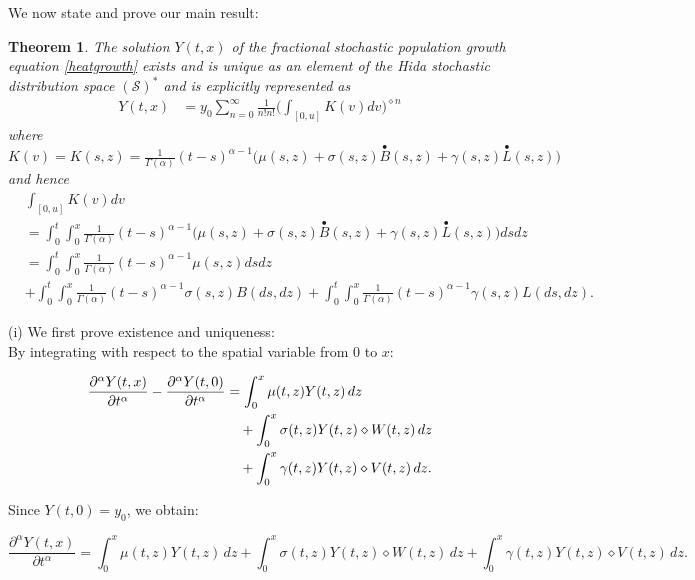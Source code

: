 \documentclass[12pt]{article}%
\newtheorem{theorem}{Theorem}[section]
\newcommand{\dproof}{\noindent {Proof.} \quad}
\numberwithin{equation}{section}
\def\S{\mathcal{S}}
\def\d{\diamond}
\def\d{\diamond}
\begin{document}
We now state and prove our main result:
\begin{theorem}
    The solution $Y(t,x)$ of the fractional stochastic population growth equation \ref{heatgrowth} exists and is unique as an element of the Hida stochastic distribution space $(\S)^{*}$ and is explicitly represented as
\begin{align}
    Y(t,x)&=y_0 \sum_{n=0}^\infty \frac{1}{n!n!} \Big(\int_{[0,u]} K(v) dv \Big)^{\d n}
\end{align}
where \\
$K(v)=K(s,z)=\frac{1}{\Gamma(\alpha)}(t-s)^{\alpha -1}\Big(\mu(s,z) +\sigma(s,z)\overset{\bullet}{B}(s,z)  + \gamma(s,z) \overset{\bullet}{L}(s,z)\Big)$\\
and hence
\begin{align}
 &\int_{[0,u]} K(v) dv\nonumber\\
 &=\int_0^t \int_0^x \frac{1}{\Gamma(\alpha)}(t-s)^{\alpha -1}\Big(\mu(s,z) +\sigma(s,z)\overset{\bullet}{B}(s,z)  + \gamma(s,z) \overset{\bullet}{L}(s,z)\Big)ds dz\nonumber \\
 &= \int_0^t\int_0^x \frac{1}{\Gamma(\alpha)}(t-s)^{\alpha -1}\mu(s,z)ds dz\nonumber \\
 &+\int_0^t\int_0^x  \frac{1}{\Gamma(\alpha)}(t-s)^{\alpha -1}\sigma(s,z) B(ds,dz) +\int_0^t\int_0^x  \frac{1}{\Gamma(\alpha)}(t-s)^{\alpha -1}\gamma(s,z) L(ds,dz).
\end{align}    
\end{theorem}

\dproof
(i) We first prove existence and uniqueness:\\
By integrating  with respect to the spatial variable from $0$ to $x$:

\begin{align}
\frac{\partial^\alpha Y(t,x)}{\partial t^\alpha} - \frac{\partial^\alpha Y(t,0)}{\partial t^\alpha} &= \int_0^x \mu(t,z) Y(t,z) \, dz \notag \\
&\quad + \int_0^x \sigma(t,z) Y(t,z) \diamond W(t,z) \, dz \notag \\
&\quad + \int_0^x \gamma(t,z) Y(t,z) \diamond V(t,z) \, dz.
\end{align}

Since $Y(t,0) = y_0$, we obtain:

\begin{equation}\label{fracderiv}
\frac{\partial^\alpha Y(t,x)}{\partial t^\alpha} = \int_0^x \mu(t,z) Y(t,z) \, dz + \int_0^x \sigma(t,z) Y(t,z) \diamond W(t,z) \, dz + \int_0^x \gamma(t,z) Y(t,z) \diamond V(t,z) \, dz.
\end{equation}
\end{document}
